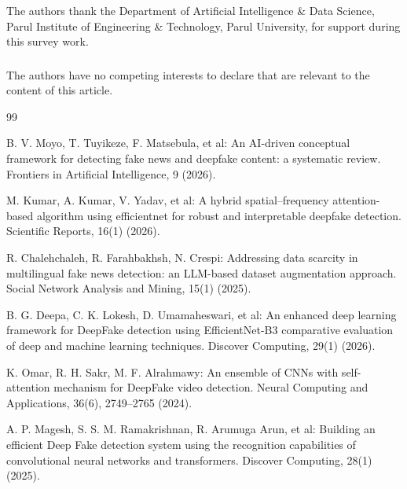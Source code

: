 \documentclass[runningheads]{llncs}
\begin{document}
\begin{credits}
\subsubsection{\ackname}
The authors thank the Department of Artificial Intelligence \& Data Science, Parul Institute of Engineering \& Technology, Parul University, for support during this survey work.

\subsubsection{\discintname}
The authors have no competing interests to declare that are relevant to the content of this article.
\end{credits}
%
\begin{thebibliography}{99}

B. V. Moyo, T. Tuyikeze, F. Matsebula, et al: An AI-driven conceptual framework for detecting fake news and deepfake content: a systematic review. Frontiers in Artificial Intelligence, 9 (2026). 

M. Kumar, A. Kumar, V. Yadav, et al: A hybrid spatial–frequency attention-based algorithm using efficientnet for robust and interpretable deepfake detection. Scientific Reports, 16(1) (2026). 

R. Chalehchaleh, R. Farahbakhsh, N. Crespi: Addressing data scarcity in multilingual fake news detection: an LLM-based dataset augmentation approach. Social Network Analysis and Mining, 15(1) (2025). 

B. G. Deepa, C. K. Lokesh, D. Umamaheswari, et al: An enhanced deep learning framework for DeepFake detection using EfficientNet-B3 comparative evaluation of deep and machine learning techniques. Discover Computing, 29(1) (2026). 

K. Omar, R. H. Sakr, M. F. Alrahmawy: An ensemble of CNNs with self-attention mechanism for DeepFake video detection. Neural Computing and Applications, 36(6), 2749–2765 (2024). 

A. P. Magesh, S. S. M. Ramakrishnan, R. Arumuga Arun, et al: Building an efficient Deep Fake detection system using the recognition capabilities of convolutional neural networks and transformers. Discover Computing, 28(1) (2025). 


\end{thebibliography}
\end{document}
